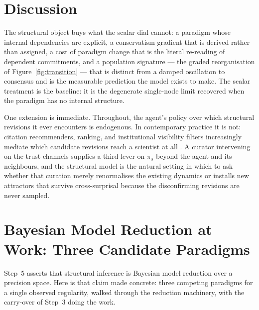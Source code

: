 \section{Discussion}
\label{sec:discussion}

The structural object buys what the scalar dial cannot: a paradigm whose
internal dependencies are explicit, a conservatism gradient that is
derived rather than assigned, a cost of paradigm change that is the
literal re-reading of dependent commitments, and a population signature
--- the graded reorganisation of Figure~\ref{fig:transition} --- that is
distinct from a damped oscillation to consensus and is the measurable
prediction the model exists to make. The scalar treatment is the
baseline: it is the degenerate single-node limit recovered when the
paradigm has no internal structure.

One extension is immediate. Throughout, the agent's policy over which
structural revisions it ever encounters is endogenous. In contemporary
practice it is not: citation recommenders, ranking, and institutional
visibility filters increasingly mediate which candidate revisions reach
a scientist at all \citep{kulveit2025GradualDisempowerment,
critchKrueger2020ARCHES}. A curator intervening on the trust channels
supplies a third lever on $\pi_s$ beyond the agent and its neighbours,
and the structural model is the natural setting in which to ask whether
that curation merely renormalises the existing dynamics or installs new
attractors that survive cross-surprisal because the disconfirming
revisions are never sampled.

\appendix
\section{Bayesian Model Reduction at Work: Three Candidate Paradigms}
\label{app:abc}

Step~5 asserts that structural inference is Bayesian model reduction over
a precision space. Here is that claim made concrete: three competing
paradigms for a single observed regularity, walked through the reduction
machinery, with the carry-over of Step~3 doing the work.

